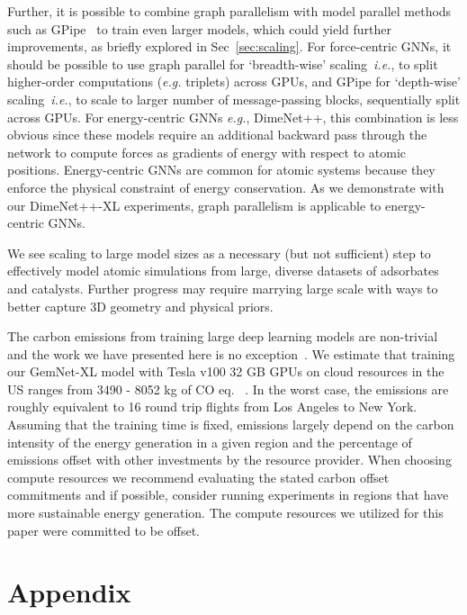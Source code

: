\documentclass{article} \usepackage{iclr2022_conference,times}
\begin{document}
Further, it is possible to combine graph parallelism with model parallel methods such as GPipe~\citep{huang2019gpipe}
to train even larger models, which could yield further improvements,
as briefly explored in Sec~\ref{sec:scaling}.
For force-centric GNNs,
it should be possible to use graph parallel for `breadth-wise' scaling~\textit{i.e.}, to split higher-order computations (\textit{e.g.} triplets)
across GPUs, and GPipe for `depth-wise' scaling~\textit{i.e.}, to scale to larger number of message-passing blocks,
sequentially split across GPUs.
For energy-centric GNNs \textit{e.g.}, DimeNet++, this combination is less obvious since these models
require an additional backward pass through the network to compute forces as gradients of
energy with respect to atomic positions.
Energy-centric GNNs are common for atomic systems because they enforce the physical constraint of energy conservation.
As we demonstrate with our DimeNet++-XL experiments, graph parallelism is applicable to energy-centric GNNs.

We see scaling to large model sizes as a necessary (but not sufficient) step to effectively
model atomic simulations from large, diverse datasets of adsorbates and catalysts.
Further progress may require marrying large scale with ways to better capture 3D geometry and physical priors.

The carbon emissions from training large deep learning models are non-trivial and the work we have presented here is no exception~\citep{strubell_arxiv19, schwartz_arxiv19}. We estimate that training our GemNet-XL model with Tesla v100 32 GB GPUs on cloud resources in the US ranges from 3490 - 8052 kg of CO eq. ~\citep{lacoste2019quantifying}. In the worst case, the emissions are roughly equivalent to 16 round trip flights from Los Angeles to New York. Assuming that the training time is fixed, emissions largely depend on the carbon intensity of the energy generation in a given region and the percentage of emissions offset with other investments by the resource provider. When choosing compute resources we recommend evaluating the stated carbon offset commitments and if possible, consider running experiments in regions that have more sustainable energy generation.
The compute resources we utilized for this paper were committed to be  offset.




\clearpage

\appendix
\section{Appendix}
\end{document}
